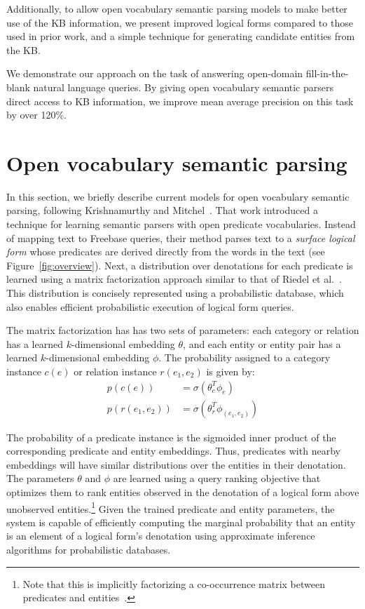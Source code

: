 \documentclass[11pt,letterpaper]{article}
\newcommand{\figref}[1]{Figure~\ref{fig:#1}}
\newcommand{\prob}{\ensuremath{p}}
\begin{document}
Additionally, to allow open vocabulary semantic parsing models to make better
use of the KB information, we present improved logical forms compared to those
used in prior work, and a simple technique for generating candidate entities
from the KB.

We demonstrate our approach on the task of answering open-domain
fill-in-the-blank natural language queries.  By giving open vocabulary semantic
parsers direct access to KB information, we improve mean average precision on
this task by over 120\%.

\section{Open vocabulary semantic parsing}
\label{sec:jayant-semparse}

In this section, we briefly describe current models for open vocabulary
semantic parsing, following Krishnamurthy and
Mitchel~.  That work
introduced a technique for learning semantic parsers with open predicate
vocabularies.  Instead of mapping text to Freebase queries, their method parses
text to a \emph{surface logical form} whose predicates are derived directly
from the words in the text (see \figref{overview}).  Next, a distribution over
denotations for each predicate is learned using a matrix factorization approach
similar to that of Riedel et al.~.
This distribution is concisely represented using a probabilistic database,
which also enables efficient probabilistic execution of logical form queries.

The matrix factorization has has two sets of parameters: each category or
relation has a learned $k$-dimensional embedding $\theta$, and each entity or
entity pair has a learned $k$-dimensional embedding $\phi$. The probability
assigned to a category instance $c(e)$ or relation instance $r(e_1, e_2)$ is
given by:
%
\begin{align*}
  \prob(c(e)) &= \sigma ( \theta_c^T \phi_e ) \\
  \prob(r(e_1, e_2)) &= \sigma ( \theta_r^T \phi_{(e_1, e_2)} )
\end{align*}

The probability of a predicate instance is the sigmoided inner product of the
corresponding predicate and entity embeddings. Thus, predicates with nearby
embeddings will have similar distributions over the entities in their
denotation. The parameters $\theta$ and $\phi$ are learned using a query
ranking objective that optimizes them to rank entities observed in the
denotation of a logical form above unobserved entities.\footnote{Note that this
is implicitly factorizing a co-occurrence matrix between predicates and
entities~\cite{levy-2014-w2v-as-mf}.} Given the trained predicate and entity
parameters, the system is capable of efficiently computing the marginal
probability that an entity is an element of a logical form's denotation using
approximate inference algorithms for probabilistic databases.
\end{document}
